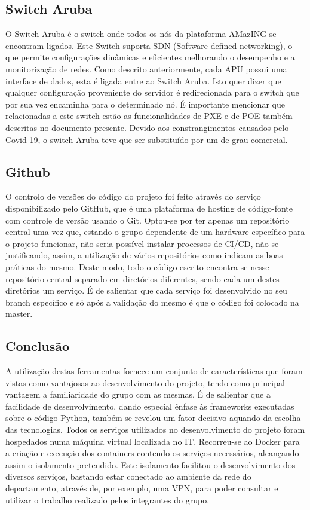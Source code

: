 \subsection{Switch Aruba}
O Switch Aruba é o switch onde todos os nós da plataforma AMazING se encontram ligados. Este Switch suporta SDN (Software-defined networking), o que permite configurações dinâmicas e eficientes melhorando o desempenho e a monitorização de redes.\newline
Como descrito anteriormente, cada APU possui uma interface de dados, esta é ligada entre ao Switch Aruba. Isto quer dizer que qualquer configuração proveniente do servidor é redirecionada para o switch que por sua vez encaminha para o determinado nó.\newline
É importante mencionar que relacionadas a este switch estão as funcionalidades de PXE e de POE também descritas no documento presente.\newline
Devido aos constrangimentos causados pelo Covid-19, o switch Aruba teve que ser substituído por um de grau comercial.


\subsection{Github}
O controlo de versões do código do projeto foi feito através do serviço disponibilizado pelo GitHub, que é uma plataforma de hosting de código-fonte com controle de versão usando o Git.\newline
Optou-se por ter apenas um repositório central uma vez que, estando o grupo dependente de um hardware específico para o projeto funcionar, não seria possível instalar processos de CI/CD, não se justificando, assim, a utilização de vários repositórios como indicam as boas práticas do mesmo. Deste modo, todo o código escrito encontra-se nesse repositório central separado em diretórios diferentes, sendo cada um destes diretórios um serviço. É de salientar que cada serviço foi desenvolvido no seu branch específico e só após a validação do mesmo é que o código foi colocado na master.

\subsection{Conclusão}
A utilização destas ferramentas fornece um conjunto de características que foram vistas como vantajosas ao desenvolvimento do projeto, tendo como principal vantagem a familiaridade do grupo com as mesmas. É de salientar que a facilidade de desenvolvimento, dando especial ênfase às frameworks executadas sobre o código Python, também se revelou um fator decisivo aquando da escolha das tecnologias.\newline
Todos os serviços utilizados no desenvolvimento do projeto foram hospedados numa máquina virtual localizada no IT. Recorreu-se ao Docker para a criação e execução dos containers contendo os serviços necessários, alcançando assim o isolamento pretendido. Este isolamento facilitou o desenvolvimento dos diversos serviços,  bastando estar conectado ao ambiente da rede do departamento, através de, por exemplo, uma VPN, para poder consultar e utilizar o trabalho realizado pelos integrantes do grupo.
\newpage
\hfill\break